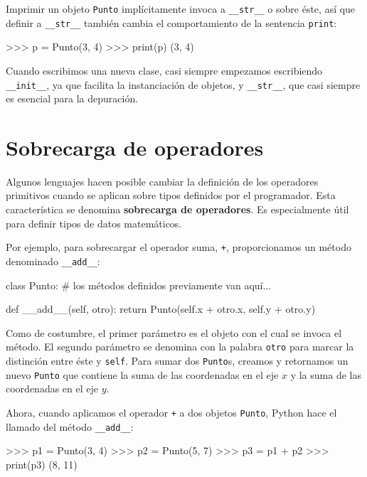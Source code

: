 Imprimir un objeto \texttt{Punto} implícitamente invoca a \texttt{\_\_str\_\_}
o sobre éste, así que definir a \texttt{\_\_str\_\_} también cambia
el comportamiento de la sentencia \texttt{print}:
\begin{pyconcode}
>>> p = Punto(3, 4)
>>> print(p)
(3, 4)
\end{pyconcode}

Cuando escribimos una nueva clase, casi siempre empezamos escribiendo
\texttt{\_\_init\_\_}, ya que facilita la instanciación de objetos,
y \texttt{\_\_str\_\_}, que casi siempre es esencial para la depuración.

\section{Sobrecarga de operadores}

\label{operator overloading}  
 

Algunos lenguajes hacen posible cambiar la definición de los operadores
primitivos cuando se aplican sobre tipos definidos por el programador.
Esta característica se denomina \textbf{sobrecarga de operadores}.
Es especialmente útil para definir tipos de datos matemáticos.

Por ejemplo, para sobrecargar el operador suma, \texttt{+}, proporcionamos
un método denominado \texttt{\_\_add\_\_}:

\pagebreak

\begin{pythoncode}
class Punto:
  # los métodos definidos previamente van aquí...

  def __add__(self, otro):
    return Punto(self.x + otro.x, self.y + otro.y)
\end{pythoncode}

Como de costumbre, el primer parámetro es el objeto con el cual se
invoca el método. El segundo parámetro se denomina con la palabra
\texttt{otro} para marcar la distinción entre éste y \texttt{self}.
Para sumar dos \texttt{Punto}s, creamos y retornamos un nuevo \texttt{Punto}
que contiene la suma de las coordenadas en el eje $x$ y la suma de
las coordenadas en el eje $y$.

Ahora, cuando aplicamos el operador \texttt{+} a dos objetos \texttt{Punto},
Python hace el llamado del método \texttt{\_\_add\_\_}:
\begin{pyconcode}
>>>   p1 = Punto(3, 4)
>>>   p2 = Punto(5, 7)
>>>   p3 = p1 + p2
>>>   print(p3)
(8, 11)
\end{pyconcode}

